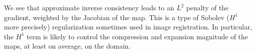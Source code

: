 {\centering
{}}
We see that approximate inverse consistency leads to an $L^2$ penalty of the gradient, weighted by the Jacobian of the map. This is a type of Sobolev ($H^1$ more precisely) regularization sometimes used in image registration. In particular, the $H^1$ term is likely to control the compression and expansion magnitude of the maps, at least on average, on the domain.

